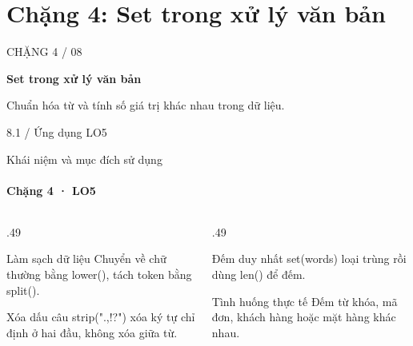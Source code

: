 \documentclass[aspectratio=169,10pt]{beamer}
\begin{document}
\section{Chặng 4: Set trong xử lý văn bản}

\begin{frame}[plain]
\vfill
{\color{white!65}\Large CHẶNG 4 / 08}\par\medskip
{\color{white}\fontsize{26}{30}\selectfont\bfseries Set trong xử lý văn bản}\par\bigskip
{\color{white!80}\large Chuẩn hóa từ và tính số giá trị khác nhau trong dữ liệu.}\par\medskip
{\color{white!80}\normalsize 8.1 / Ứng dụng \hspace{1.2cm} LO5}
\vfill
\end{frame}

\begin{frame}[t]{Khái niệm và mục đích sử dụng}
\framesubtitle{Chặng 4 · LO5}
\begin{columns}[t,onlytextwidth]
\begin{column}{.49\linewidth}
\begin{block}{Làm sạch dữ liệu}
Chuyển về chữ thường bằng lower(), tách token bằng split().
\end{block}
\begin{block}{Xóa dấu câu}
strip(".,!?") xóa ký tự chỉ định ở hai đầu, không xóa giữa từ.
\end{block}
\end{column}
\begin{column}{.49\linewidth}
\begin{block}{Đếm duy nhất}
set(words) loại trùng rồi dùng len() để đếm.
\end{block}
\begin{block}{Tình huống thực tế}
Đếm từ khóa, mã đơn, khách hàng hoặc mặt hàng khác nhau.
\end{block}
\end{column}
\end{columns}

\end{frame}
\end{document}
